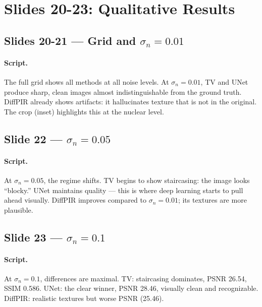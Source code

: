 \documentclass[english,11pt,a4paper]{article}
\begin{document}
\section{Slides 20-23: Qualitative Results}

\subsection{Slides 20-21 --- Grid and $\sigma_n=0.01$}

\paragraph{Script.}
The full grid shows all methods at all noise levels. At $\sigma_n=0.01$,
TV and UNet produce sharp, clean images almost indistinguishable from
the ground truth. DiffPIR already shows artifacts: it hallucinates
texture that is not in the original. The crop (inset) highlights this
at the nuclear level.

\subsection{Slide 22 --- $\sigma_n=0.05$}

\paragraph{Script.}
At $\sigma_n=0.05$, the regime shifts. TV begins to show staircasing:
the image looks ``blocky.'' UNet maintains quality --- this is where
deep learning starts to pull ahead visually. DiffPIR improves compared
to $\sigma_n=0.01$; its textures are more plausible.

\subsection{Slide 23 --- $\sigma_n=0.1$}

\paragraph{Script.}
At $\sigma_n=0.1$, differences are maximal. TV: staircasing dominates,
PSNR 26.54, SSIM 0.586. UNet: the clear winner, PSNR 28.46, visually
clean and recognizable. DiffPIR: realistic textures but worse PSNR
(25.46).
\end{document}
